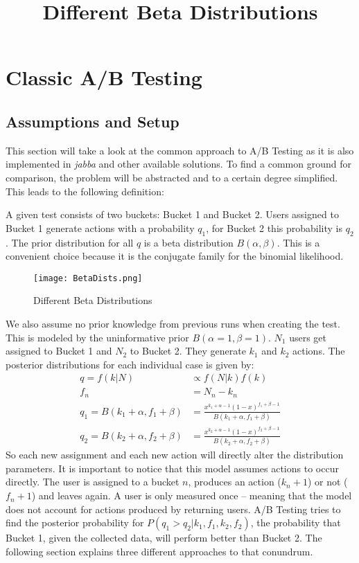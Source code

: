 \documentclass[../Thesis.tex]{subfiles}
\begin{document}
\chapter{Classic A/B Testing}

\section{Assumptions and Setup}\label{sec:setup}
This section will take a look at the common approach to A/B Testing as it is also implemented in \emph{jabba} and other available solutions. To find a common ground for comparison, the problem will be abstracted and to a certain degree simplified. This leads to the following definition:

A given test consists of two buckets: Bucket 1 and Bucket 2. Users assigned to Bucket 1 generate actions with a probability $q_1$, for Bucket 2 this probability is $q_2$. The prior distribution for all $q$ is a beta distribution $B(\alpha,\beta)$. This is a convenient choice because it is the conjugate family for the binomial likelihood. 

\begin{figure}[h]
\texttt{[image: BetaDists.png]}
\centering
\title{Different Beta Distributions}
\caption{Different Beta Distributions}
\end{figure}

We also assume no prior knowledge from previous runs when creating the test. This is modeled by the uninformative prior $B(\alpha=1,\beta=1)$. $N_1$ users get assigned to Bucket 1 and $N_2$ to Bucket 2. They generate $k_1$ and $k_2$ actions. The posterior distributions for each individual case is given by:
\begin{align*}
q = f(k|N) &\propto f(N|k)f(k)\\
f_n &= N_n-k_n \\
q_1 = B(k_1+\alpha,f_1+\beta) & = \frac{x^{k_1+\alpha-1}(1-x)^{f_1+\beta -1}}{B(k_1+\alpha,f_1+\beta)} \\
q_2 = B(k_2+\alpha,f_2+\beta) & = \frac{x^{k_2+\alpha-1}(1-x)^{f_2+\beta -1}}{B(k_2+\alpha,f_2+\beta)}
\end{align*}
So each new assignment and each new action will directly alter the distribution parameters. It is important to notice that this model assumes actions to occur directly. The user is assigned to a bucket $n$, produces an action ($k_n + 1$) or not ($f_n + 1$) and leaves again. A user is only measured once -- meaning that the model does not account for actions produced by returning users.
A/B Testing tries to find the posterior probability for $P(q_1>q_2 | k_1,f_1,k_2,f_2)$, the probability that Bucket 1, given the collected data, will perform better than Bucket 2. The following section explains three different approaches to that conundrum.
\end{document}
